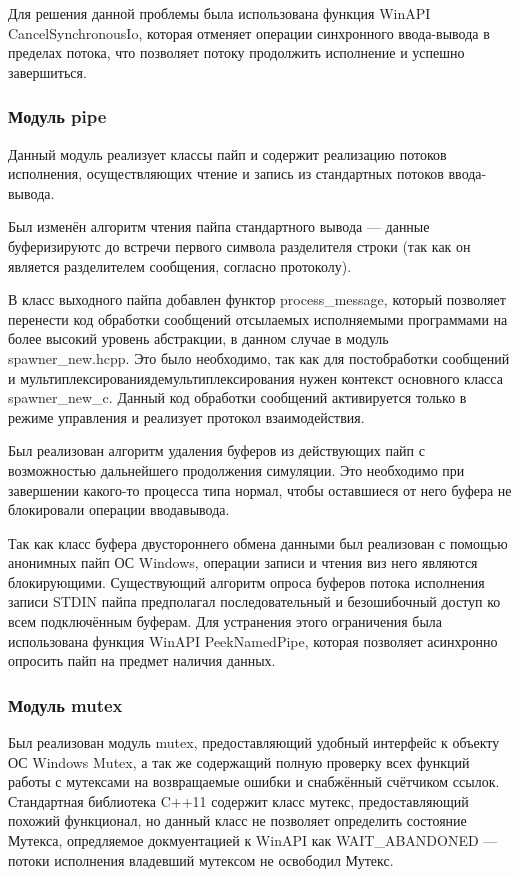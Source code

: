 \documentclass{imcs}
\begin{document}
Для решения данной проблемы была использована функция WinAPI\\CancelSynchronousIo, которая отменяет операции синхронного ввода-вывода в пределах потока, что позволяет потоку продолжить исполнение и успешно завершиться.

\subsubsection{Модуль pipe}

Данный модуль реализует классы пайп и содержит реализацию потоков исполнения, осуществляющих чтение и запись из стандартных потоков ввода-вывода.

Был изменён алгоритм чтения пайпа стандартного вывода — данные буферизируютс до встречи первого символа разделителя строки (так как он является разделителем сообщения, согласно протоколу).

В класс выходного пайпа добавлен функтор process\_message, который позволяет перенести код обработки сообщений отсылаемых исполняемыми программами на более высокий уровень абстракции, в данном случае в модуль spawner\_new.h\/cpp. Это было необходимо, так как для постобработки сообщений и мультиплексирования\/демультиплексирования нужен контекст основного класса spawner\_new\_c. Данный код обработки сообщений активируется только в режиме управления и реализует протокол взаимодействия.

Был реализован алгоритм удаления буферов из действующих пайп с возможностью дальнейшего продолжения симуляции. Это необходимо при завершении какого-то процесса типа нормал, чтобы оставшиеся от него буфера не блокировали операции ввода\/вывода.

Так как класс буфера двустороннего обмена данными был реализован с помощью анонимных пайп ОС Windows, операции записи и чтения в\/из него являются блокирующими. Существующий алгоритм опроса буферов потока исполнения записи STDIN пайпа предполагал последовательный и безошибочный доступ ко всем подключённым буферам. Для устранения этого ограничения была использована функция WinAPI PeekNamedPipe, которая позволяет асинхронно опросить пайп на предмет наличия данных.

\subsubsection{Модуль mutex}

Был реализован модуль mutex, предоставляющий удобный интерфейс к объекту ОС Windows Mutex, а так же содержащий полную проверку всех функций работы с мутексами на возвращаемые ошибки и снабжённый счётчиком ссылок. Стандартная библиотека C++11 содержит класс мутекс, предоставляющий похожий функционал, но данный класс не позволяет определить состояние Мутекса, опредляемое докмуентацией к WinAPI как WAIT\_ABANDONED — потоки исполнения владевший мутексом не освободил Мутекс.
\end{document}
